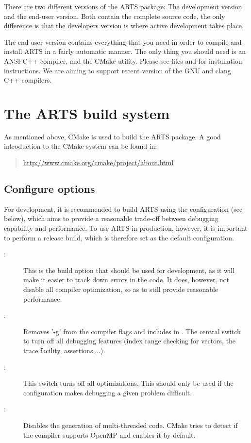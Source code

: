 There are two different versions of the ARTS package: The development version
and the end-user version. Both contain the complete source code, the only
difference is that the developers version is where active development takes
place.

The end-user version contains everything that you need in order to compile and
install ARTS in a fairly automatic manner. The only thing you should need is an
ANSI-C++ compiler, and the CMake utility. Please see files
 and  for installation
instructions. We are aiming to support recent version of the GNU and clang C++
compilers.

\section{The ARTS build system}

As mentioned above, CMake is used to build the ARTS package. A good introduction
to the CMake system can be found in:
\begin{quote}
  \url{http://www.cmake.org/cmake/project/about.html}
\end{quote}


\subsection{Configure options}

For development, it is recommended to build ARTS using the
 configuration (see below), which aims to provide a
reasonable trade-off between debugging capability and performance. To use ARTS
in production, however, it is important to perform a release build, which is
therefore set as the default configuration.

\begin{description}
\item[:] This is the build option
  that should be used for development, as it will make it easier to track down
  errors in the code. It does, however, not disable all compiler optimization,
  so as to still provide reasonable performance.
\item[:] Removes '-g' from
the compiler flags and includes  in
. The central switch to turn off all debugging
features (index range checking for vectors, the trace facility,
assertions,...).
\item[:] This switch turns off all
  optimizations. This should only be used if the 
  configuration makes debugging a given problem difficult.
\item[:] 
Disables the generation of multi-threaded code. CMake tries to detect if the compiler supports OpenMP and enables it by default.

\end{description}


